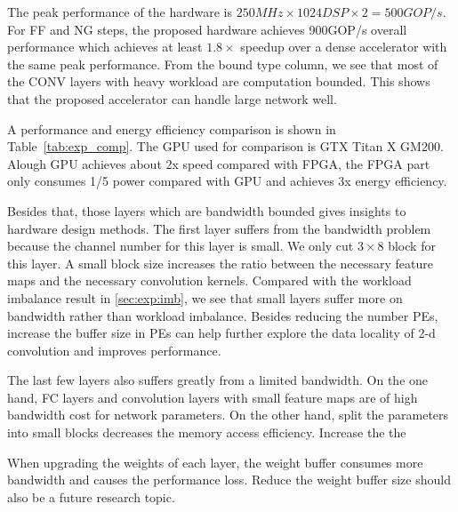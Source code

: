 The peak performance of the hardware is $250MHz \times 1024DSP \times 2 = 500GOP/s$. For FF and NG steps, the proposed hardware achieves 900GOP/s overall performance which achieves at least $1.8\times$ speedup over a dense accelerator with the same peak performance. From the bound type column, we see that most of the CONV layers with heavy workload are computation bounded. This shows that the proposed accelerator can handle large network well.

A performance and energy efficiency comparison is shown in Table~\ref{tab:exp_comp}. The GPU used for comparison is GTX Titan X GM200. Alough GPU achieves about 2x speed compared with FPGA, the FPGA part only consumes 1/5 power compared with GPU and achieves 3x energy efficiency.

Besides that, those layers which are bandwidth bounded gives insights to hardware design methods. The first layer suffers from the bandwidth problem because the channel number for this layer is small. We only cut $3\times 8$ block for this layer. A small block size increases the ratio between the necessary feature maps and the necessary convolution kernels. Compared with the workload imbalance result in \ref{sec:exp:imb}, we see that small layers suffer more on bandwidth rather than workload imbalance. Besides reducing the number PEs, increase the buffer size in PEs can help further explore the data locality of 2-d convolution and improves performance. 

The last few layers also suffers greatly from a limited bandwidth. On the one hand, FC layers and convolution layers with small feature maps are of high bandwidth cost for network parameters. On the other hand, split the parameters into small blocks decreases the memory access efficiency. Increase the the 

When upgrading the weights of each layer, the weight buffer consumes more bandwidth and causes the performance loss. Reduce the weight buffer size should also be a future research topic. 





